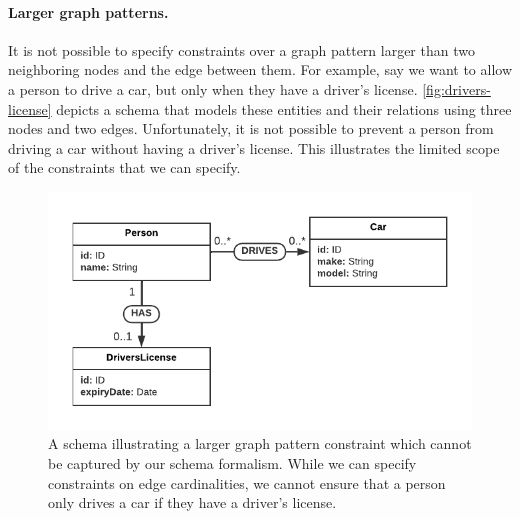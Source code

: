 \documentclass{report}
\theoremstyle{definition}
\begin{document}
\paragraph{Larger graph patterns.} It is not possible to specify constraints over a graph pattern larger than two neighboring nodes and the edge between them. For example, say we want to allow a person to drive a car, but only when they have a driver's license. \autoref{fig:drivers-license} depicts a schema that models these entities and their relations using three nodes and two edges. Unfortunately, it is not possible to prevent a person from driving a car without having a driver's license. This illustrates the limited scope of the constraints that we can specify.

\begin{figure}[t]
  \centering
  \includegraphics{figures/drivers-license.pdf}
  \caption[A schema illustrating a larger graph pattern constraint which cannot be captured by our schema formalism]{A schema illustrating a larger graph pattern constraint which cannot be captured by our schema formalism. While we can specify constraints on edge cardinalities, we cannot ensure that a person only drives a car if they have a driver's license.}
  \label{fig:drivers-license}
\end{figure}


\end{document}
